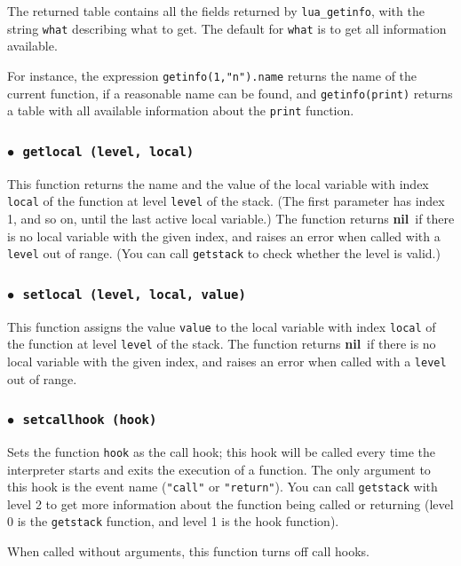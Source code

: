 \documentclass[11pt]{article}
\newcommand{\T}[1]{{\tt #1}}
\newcommand{\nil}{{\bf nil}}
\newcommand{\Deffunc}[1]{\index{#1}}
\newcommand{\ff}{$\bullet$\ }
\begin{document}
The returned table contains all the fields returned by \verb|lua_getinfo|,
with the string \verb|what| describing what to get.
The default for \verb|what| is to get all information available.

For instance, the expression \verb|getinfo(1,"n").name| returns
the name of the current function, if a reasonable name can be found,
and \verb|getinfo(print)| returns a table with all available information
about the \verb|print| function.


\subsubsection*{\ff \T{getlocal (level, local)}}\Deffunc{getlocal}

This function returns the name and the value of the local variable
with index \verb|local| of the function at level \verb|level| of the stack.
(The first parameter has index 1, and so on,
until the last active local variable.)
The function returns \nil\ if there is no local
variable with the given index,
and raises an error when called with a \verb|level| out of range.
(You can call \verb|getstack| to check whether the level is valid.)

\subsubsection*{\ff \T{setlocal (level, local, value)}}\Deffunc{setlocal}

This function assigns the value \verb|value| to the local variable
with index \verb|local| of the function at level \verb|level| of the stack.
The function returns \nil\ if there is no local
variable with the given index,
and raises an error when called with a \verb|level| out of range.

\subsubsection*{\ff \T{setcallhook (hook)}}\Deffunc{setcallhook}

Sets the function \verb|hook| as the call hook;
this hook will be called every time the interpreter starts and
exits the execution of a function.
The only argument to this hook is the event name (\verb|"call"| or
\verb|"return"|).
You can call \verb|getstack| with level 2 to get more information about
the function being called or returning
(level 0 is the \verb|getstack| function,
and level 1 is the hook function).

When called without arguments,
this function turns off call hooks.
\end{document}
